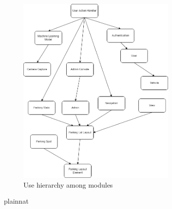 \documentclass[12pt, titlepage]{article}
\begin{document}
\begin{figure}[H]
\centering
\includegraphics[width=0.7\textwidth]{UsesDiagram.png}
\caption{Use hierarchy among modules}
\label{FigUH}
\end{figure}


\newpage

 {plainnat}


\newpage{}
\end{document}
